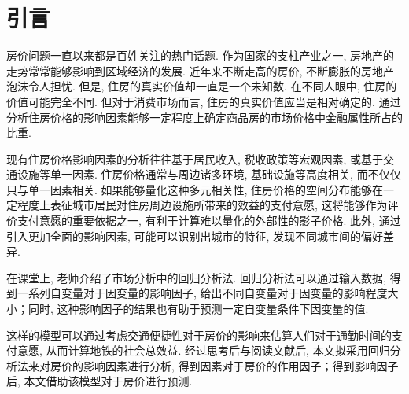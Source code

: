 \section{引言}
房价问题一直以来都是百姓关注的热门话题.
作为国家的支柱产业之一, 房地产的走势常常能够影响到区域经济的发展.
近年来不断走高的房价, 不断膨胀的房地产泡沫令人担忧.
但是, 住房的真实价值却一直是一个未知数.
在不同人眼中, 住房的价值可能完全不同.
但对于消费市场而言, 住房的真实价值应当是相对确定的.
通过分析住房价格的影响因素能够一定程度上确定商品房的市场价格中金融属性所占的比重.

现有住房价格影响因素的分析往往基于居民收入, 税收政策等宏观因素, 或基于交通设施等单一因素.
住房价格通常与周边诸多环境, 基础设施等高度相关, 而不仅仅只与单一因素相关.
如果能够量化这种多元相关性, 住房价格的空间分布能够在一定程度上表征城市居民对住房周边设施所带来的效益的支付意愿, 这将能够作为评价支付意愿的重要依据之一, 有利于计算难以量化的外部性的影子价格.
此外, 通过引入更加全面的影响因素, 可能可以识别出城市的特征, 发现不同城市间的偏好差异.

在课堂上, 老师介绍了市场分析中的回归分析法.
回归分析法可以通过输入数据, 得到一系列自变量对于因变量的影响因子, 给出不同自变量对于因变量的影响程度大小；同时, 这种影响因子的结果也有助于预测一定自变量条件下因变量的值.

这样的模型可以通过考虑交通便捷性对于房价的影响来估算人们对于通勤时间的支付意愿, 从而计算地铁的社会总效益.
经过思考后与阅读文献后, 本文拟采用回归分析法来对房价的影响因素进行分析, 得到因素对于房价的作用因子；得到影响因子后, 本文借助该模型对于房价进行预测.

